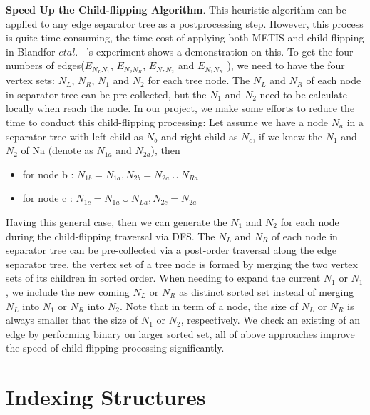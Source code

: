 \documentclass[12pt,glossary]{dalthesis}
\begin{document}
\bigskip
\bigskip

\textbf{Speed Up the Child-flipping Algorithm}. This heuristic algorithm can be applied to any edge separator tree as a postprocessing step. However, this process is quite time-consuming, the time cost of applying both METIS and child-flipping in Blandfor $et al.$ ~\cite{compact-representation}'s experiment shows a demonstration on this. To get the four numbers of edges($E_{N_{L}N_{1}}$, $E_{N_{2}N_{R}}$, $E_{N_{L}N_{2}}$ and $E_{N_{1}N_{R}}$ ), we need to have the four vertex sets: $N_{L}$, $N_{R}$, $N_{1}$ and $N_{2}$ for each tree node. The $N_{L}$ and $N_{R}$ of each node in separator tree can be pre-collected, but the $N_{1}$ and $N_{2}$ need to be calculate locally when reach the node. In our project, we make some efforts to reduce the time to conduct this child-flipping processing: Let assume we have a node $N_{a}$ in a separator tree with left child as $N_{b}$ and right child as $N_{c}$, if we knew the $N_{1}$ and $N_{2}$ of Na (denote as $N_{1a}$ and $N_{2a}$), then

\begin{itemize}[noitemsep]
\item for node b : $ N_{1b} = N_{1a}, N_{2b} = N_{2a} \cup N_{Ra}$
\item for node c : $ N_{1c} = N_{1a} \cup N_{La}, N_{2c} = N_{2a}$ 
\end{itemize}

Having this general case, then we can generate the $N_{1}$ and $N_{2}$ for each node during the child-flipping traversal via DFS. The $N_{L}$ and $N_{R}$ of each node in separator tree can be pre-collected via a post-order traversal along the edge separator tree, the vertex set of a tree node is formed by merging the two vertex sets of its children in sorted order. When needing to expand the current $N_{1}$ or $N_{1}$, we include the new coming $N_{L}$ or $N_{R}$ as distinct sorted set instead of merging $N_{L}$ into $N_{1}$ or $N_{R}$ into $N_{2}$. Note that in term of a node, the size of $N_{L}$ or $N_{R}$ is always smaller that the size of $N_{1}$ or $N_{2}$, respectively. We check an existing of an edge by performing binary on larger sorted set, all of above approaches improve the speed of child-flipping processing significantly.

\chapter{Indexing Structures}
\end{document}

